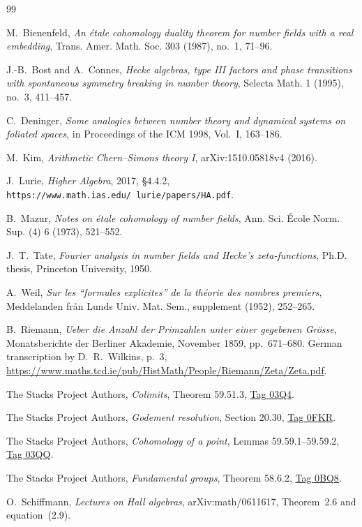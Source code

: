 \begin{thebibliography}{99}

M.~Bienenfeld,
\emph{An \'etale cohomology duality theorem for number fields with a real
embedding}, Trans. Amer. Math. Soc. 303 (1987), no.~1, 71--96.

J.-B.~Bost and A.~Connes,
\emph{Hecke algebras, type III factors and phase transitions with
spontaneous symmetry breaking in number theory}, Selecta Math. 1 (1995),
no.~3, 411--457.

C.~Deninger,
\emph{Some analogies between number theory and dynamical systems on
foliated spaces}, in Proceedings of the ICM 1998, Vol.~I, 163--186.

M.~Kim,
\emph{Arithmetic Chern--Simons theory I}, arXiv:1510.05818v4 (2016).

J.~Lurie,
\emph{Higher Algebra}, 2017, \S4.4.2,
\texttt{https://www.math.ias.edu/{\string~}lurie/papers/HA.pdf}.

B.~Mazur,
\emph{Notes on \'etale cohomology of number fields}, Ann. Sci. \'Ecole
Norm. Sup. (4) 6 (1973), 521--552.

J.~T.~Tate,
\emph{Fourier analysis in number fields and Hecke's zeta-functions},
Ph.D. thesis, Princeton University, 1950.

A.~Weil,
\emph{Sur les ``formules explicites'' de la th\'eorie des nombres
premiers}, Meddelanden fr\aa n Lunds Univ. Mat. Sem., supplement (1952),
252--265.

B.~Riemann,
\emph{Ueber die Anzahl der Primzahlen unter einer gegebenen Gr\"osse},
Monatsberichte der Berliner Akademie, November 1859, pp.~671--680.
German transcription by D.~R.~Wilkins, p.~3,
\url{https://www.maths.tcd.ie/pub/HistMath/People/Riemann/Zeta/Zeta.pdf}.

The Stacks Project Authors, \emph{Colimits}, Theorem 59.51.3,
\href{https://stacks.math.columbia.edu/tag/03Q4}{Tag 03Q4}.

The Stacks Project Authors, \emph{Godement resolution}, Section 20.30,
\href{https://stacks.math.columbia.edu/tag/0FKR}{Tag 0FKR}.

The Stacks Project Authors, \emph{Cohomology of a point},
Lemmas 59.59.1--59.59.2,
\href{https://stacks.math.columbia.edu/tag/03QQ}{Tag 03QQ}.

The Stacks Project Authors,
\emph{Fundamental groups}, Theorem 58.6.2,
\href{https://stacks.math.columbia.edu/tag/0BQ8}{Tag 0BQ8}.

O.~Schiffmann, \emph{Lectures on Hall algebras},
arXiv:math/0611617, Theorem~2.6 and equation~(2.9).

\end{thebibliography}
